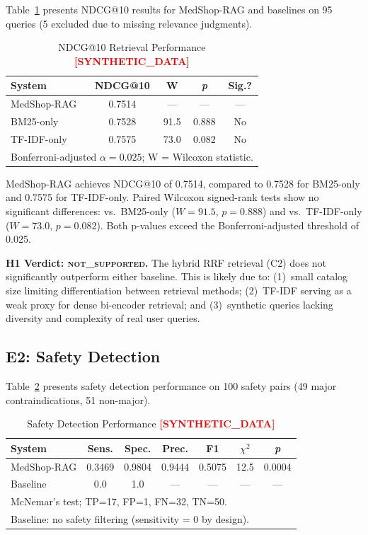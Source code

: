 \documentclass[conference]{IEEEtran}
\newcommand{\synflag}{\textcolor{red}{\textbf{[SYNTHETIC\_DATA]}}}
\begin{document}
Table~\ref{tab:ndcg} presents NDCG@10 results for MedShop-RAG and baselines on
95 queries (5 excluded due to missing relevance judgments).

\begin{table}[t]
\centering
\caption{NDCG@10 Retrieval Performance \synflag{}}
\label{tab:ndcg}
\renewcommand{\arraystretch}{1.2}
\begin{tabular}{lcccc}
\toprule
\textbf{System} & \textbf{NDCG@10} & \textbf{W} & \textbf{\textit{p}} & \textbf{Sig.?}\\
\midrule
MedShop-RAG  & 0.7514 & ---  & ---   & --- \\
BM25-only    & 0.7528 & 91.5 & 0.888 & No  \\
TF-IDF-only  & 0.7575 & 73.0 & 0.082 & No  \\
\bottomrule
\multicolumn{5}{l}{\footnotesize Bonferroni-adjusted $\alpha{=}0.025$; W = Wilcoxon statistic.}
\end{tabular}
\end{table}

MedShop-RAG achieves NDCG@10 of 0.7514, compared to 0.7528 for BM25-only and
0.7575 for TF-IDF-only. Paired Wilcoxon signed-rank tests show no significant
differences: vs.\ BM25-only ($W{=}91.5$, $p{=}0.888$) and vs.\ TF-IDF-only
($W{=}73.0$, $p{=}0.082$). Both p-values exceed the Bonferroni-adjusted
threshold of 0.025.

\textbf{H1 Verdict: \textsc{not\_supported}.} The hybrid RRF retrieval (C2) does
not significantly outperform either baseline. This is likely due to: (1)~small
catalog size limiting differentiation between retrieval methods; (2)~TF-IDF
serving as a weak proxy for dense bi-encoder retrieval; and (3)~synthetic
queries lacking diversity and complexity of real user queries.

\subsection{E2: Safety Detection}

Table~\ref{tab:safety} presents safety detection performance on 100 safety pairs
(49 major contraindications, 51 non-major).

\begin{table}[t]
\centering
\caption{Safety Detection Performance \synflag{}}
\label{tab:safety}
\renewcommand{\arraystretch}{1.2}
\begin{tabular}{lcccccc}
\toprule
\textbf{System} & \textbf{Sens.} & \textbf{Spec.} & \textbf{Prec.} & \textbf{F1} & $\chi^2$ & \textbf{\textit{p}}\\
\midrule
MedShop-RAG & 0.3469 & 0.9804 & 0.9444 & 0.5075 & 12.5 & 0.0004\\
Baseline    & 0.0    & 1.0    & ---    & ---    & ---  & ---   \\
\bottomrule
\multicolumn{7}{l}{\footnotesize McNemar's test; TP=17, FP=1, FN=32, TN=50.}\\
\multicolumn{7}{l}{\footnotesize Baseline: no safety filtering (sensitivity = 0 by design).}
\end{tabular}
\end{table}
\end{document}
